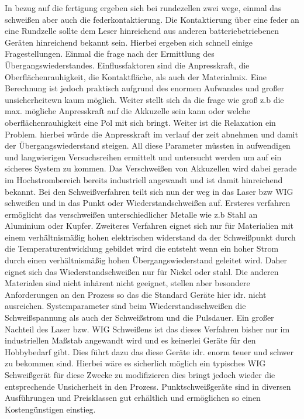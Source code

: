 In bezug auf die fertigung ergeben sich bei rundezellen zwei wege, einmal das schweißen aber auch die federkontaktierung.
Die Kontaktierung über eine feder an eine Rundzelle sollte dem Leser hinreichend aus anderen batteriebetriebenen Geräten hinreichend bekannt sein. Hierbei ergeben sich schnell einige Fragestellungen. Einmal die frage nach der Ermittlung des Übergangswiederstandes. Einflussfaktoren sind die Anpresskraft, die Oberflächenrauhigkeit, die Kontaktfläche, als auch der Materialmix. Eine Berechnung ist jedoch praktisch aufgrund des enormen Aufwandes und großer unsicherheitewn kaum möglich. Weiter stellt sich da die frage wie groß z.b die max. mögliche Anpresskraft auf die Akkuzelle sein kann oder welche oberflächenrauhigkeit eine Pol mit sich bringt. Weiter ist die Relaxation ein Problem. hierbei würde die Anpresskraft im verlauf der zeit abnehmen und damit der Übergangswiederstand steigen. All diese Parameter müssten in aufwendigen und langwierigen Versuchsreihen ermittelt und untersucht werden um auf ein sicheres System zu kommen. Das Verschweißen von Akkuzellen wird dabei gerade im Hochstrombereich bereits industriell angewandt und ist damit hinreichend bekannt. 
Bei den Schweißverfahren teilt sich nun der weg in das Laser bzw WIG schweißen und in das Punkt oder Wiederstandschweißen auf. Ersteres verfahren ermöglicht das verschweißen unterschiedlicher Metalle wie z.b Stahl an Aluminium oder Kupfer. Zweiteres Verfahren eignet sich nur für Materialien mit einem verhältnismäßig hohen elektrischen widerstand da der Schweißpunkt durch die Temperaturentwicklung gebildet wird die entsteht wenn ein hoher Strom durch einen verhältnismäßig hohen Übergangswiederstand geleitet wird. Daher eignet sich das Wiederstandschweißen nur für Nickel oder stahl. Die anderen Materialen sind nicht inhärent nicht geeignet, stellen aber besondere Anforderungen an den Prozess so das die Standard Geräte hier idr. nicht ausreichen. Systemparameter sind beim Wiederstandsschweißen die Schweißspannung als auch der Schweißstrom und die Pulsdauer. Ein großer Nachteil des Laser bzw. WIG Schweißens ist das dieses Verfahren bisher nur im industriellen Maßstab angewandt wird und es keinerlei Geräte für den Hobbybedarf gibt. Dies führt dazu das diese Geräte idr. enorm teuer und schwer zu bekommen sind. Hierbei wäre es sicherlich möglich ein typisches WIG Schweißgerät für diese Zwecke zu modifizieren dies bringt jedoch wieder die entsprechende Unsicherheit in den Prozess. Punktschweißgeräte sind in diversen Ausführungen und Preisklassen gut erhältlich und ermöglichen so einen Kostengünstigen einstieg.
	
